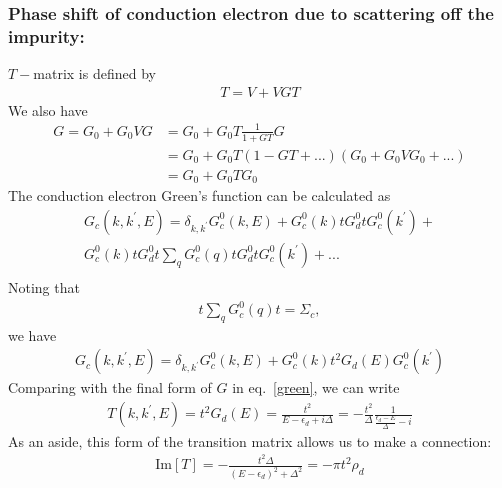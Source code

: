 \documentclass[twoside,11pt]{report}
\numberwithin{equation}{section}
\begin{document}
\subsubsection{Phase shift of conduction electron due to scattering off the impurity:}
\(T-\)matrix is defined by
\begin{equation}\begin{aligned}
T = V + VGT 
\end{aligned}\end{equation}
We also have
\begin{equation}\begin{aligned}
G = G_0 + G_0VG &= G_0 + G_0 T \frac{1}{1+GT}G \\
        &= G_0 + G_0T(1-GT+...)(G_0+G_0VG_0+...)\\
        &= G_0 + G_0 T G_0 \label{green}
\end{aligned}\end{equation}
The conduction electron Green's function can be calculated as
\begin{equation}\begin{aligned}
G_c(k,k^\prime,E) = \delta_{k,k^\prime}G^0_c(k,E) + G_c^0(k)t G^0_d t G^0_c(k^\prime) + \\ G_c^0(k)t G^0_d t \sum_q G_c^0(q) t G^0_d t G^0_c(k^\prime) + ...\\
\end{aligned}\end{equation}
Noting that 
\begin{equation}\begin{aligned}
t\sum_q G_c^0(q)t = \Sigma_c,
\end{aligned}\end{equation}
we have
\begin{equation}\begin{aligned}
G_c(k,k^\prime,E) = \delta_{k,k^\prime}G^0_c(k,E) + G_c^0(k)t^2 G_d(E)G_c^0(k^\prime)
\end{aligned}\end{equation}
Comparing with the final form of \(G\) in eq.~\ref{green}, we can write
\begin{equation}\begin{aligned}
	\label{tm}
T(k,k^\prime,E) = t^2 G_d(E) = \frac{t^2}{E-\epsilon_d + i\Delta}=-\frac{t^2}{\Delta} \frac{1}{\frac{ \epsilon_d- E}{\Delta}-i}
\end{aligned}\end{equation}
As an aside, this form of the transition matrix allows us to make a connection:
\begin{equation}\begin{aligned}
	\label{dsfromtmat}
	\text{Im}[T] = -\frac{t^2 \Delta}{\left(E-\epsilon_d\right)^2+\Delta^2} = -\pi t^2 \rho_d
\end{aligned}\end{equation}
\end{document}
